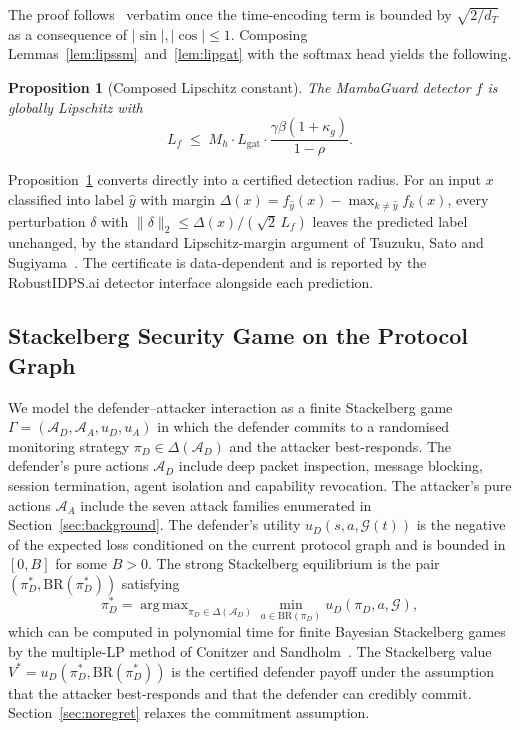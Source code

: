 \documentclass[journal,10pt,twocolumn]{IEEEtran}
\newtheorem{proposition}[theorem]{Proposition}
\DeclareMathOperator*{\argmax}{arg\,max}
\newcommand{\calA}{\mathcal{A}}
\newcommand{\calG}{\mathcal{G}}
\begin{document}
The proof follows~\cite{Dasoulas2021LipNorm} verbatim once the time-encoding term is bounded by $\sqrt{2/d_{T}}$ as a consequence of $|\sin|,|\cos|\le 1$. Composing Lemmas~\ref{lem:lipssm}~and~\ref{lem:lipgat} with the softmax head yields the following.

\begin{proposition}[Composed Lipschitz constant]
\label{prop:lipfull}
The MambaGuard detector $f$ is globally Lipschitz with
\begin{equation}
L_{f} \;\le\; M_{h}\cdot L_{\text{gat}}\cdot\frac{\gamma\beta(1+\kappa_{g})}{1-\rho}.
\label{eq:lipfull}
\end{equation}
\end{proposition}

Proposition~\ref{prop:lipfull} converts directly into a certified detection radius. For an input $x$ classified into label $\hat y$ with margin $\Delta(x)=f_{\hat y}(x)-\max_{k\ne\hat y}f_{k}(x)$, every perturbation $\delta$ with $\|\delta\|_{2}\le\Delta(x)/(\sqrt 2\,L_{f})$ leaves the predicted label unchanged, by the standard Lipschitz-margin argument of Tsuzuku, Sato and Sugiyama~\cite{Tsuzuku2018LipMargin}. The certificate is data-dependent and is reported by the RobustIDPS.ai detector interface alongside each prediction.

\subsection{Stackelberg Security Game on the Protocol Graph}
\label{sec:stackelberg}
We model the defender--attacker interaction as a finite Stackelberg game $\Gamma=(\calA_{D},\calA_{A},u_{D},u_{A})$ in which the defender commits to a randomised monitoring strategy $\pi_{D}\in\Delta(\calA_{D})$ and the attacker best-responds. The defender's pure actions $\calA_{D}$ include deep packet inspection, message blocking, session termination, agent isolation and capability revocation. The attacker's pure actions $\calA_{A}$ include the seven attack families enumerated in Section~\ref{sec:background}. The defender's utility $u_{D}(s,a,\calG(t))$ is the negative of the expected loss conditioned on the current protocol graph and is bounded in $[0,B]$ for some $B>0$. The strong Stackelberg equilibrium is the pair $(\pi_{D}^{*},\mathrm{BR}(\pi_{D}^{*}))$ satisfying
\begin{equation}
\pi_{D}^{*} = \argmax_{\pi_{D}\in\Delta(\calA_{D})}\min_{a\in\mathrm{BR}(\pi_{D})}u_{D}(\pi_{D},a,\calG),
\label{eq:stack}
\end{equation}
which can be computed in polynomial time for finite Bayesian Stackelberg games by the multiple-LP method of Conitzer and Sandholm~\cite{Conitzer2006Commit,Paruchuri2008DOBSS}. The Stackelberg value $V^{*}=u_{D}(\pi_{D}^{*},\mathrm{BR}(\pi_{D}^{*}))$ is the certified defender payoff under the assumption that the attacker best-responds and that the defender can credibly commit. Section~\ref{sec:noregret} relaxes the commitment assumption.
\end{document}
